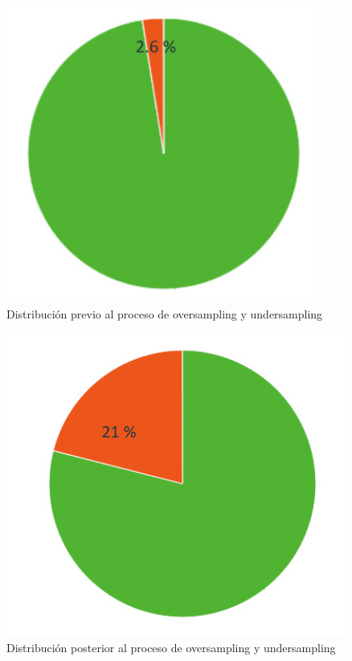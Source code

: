 \documentclass[12pt]{report} %
\begin{document}
\begin{minipage}{0.45\textwidth}
    \begin{figure}[H]
    \includegraphics[width=0.9\textwidth]{datos-prev.jpg}
    \caption  {\small{Distribución previo al proceso de oversampling y undersampling}}
    \end{figure}
\end{minipage}
\hspace{0.5cm}
\begin{minipage}{0.45\textwidth}
    \begin{figure}[H]
    \includegraphics[width=\textwidth]{datos-post.jpg}
    \caption  {\small{Distribución posterior al proceso de oversampling y undersampling}}
    \end{figure}
\end{minipage}
\end{document}
